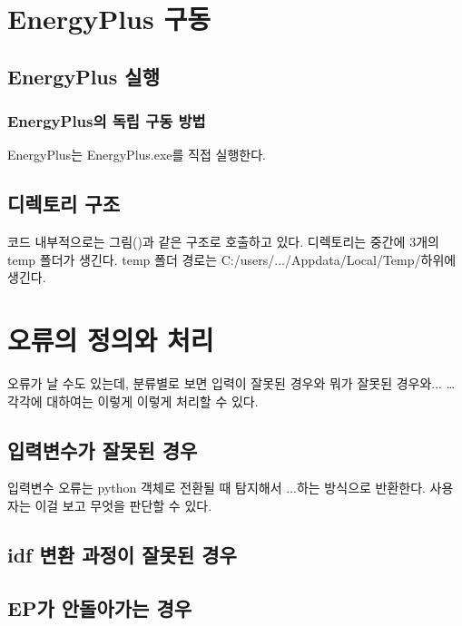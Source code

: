 
\section{EnergyPlus 구동}
\subsection{EnergyPlus 실행}
\subsubsection{EnergyPlus의 독립 구동 방법}
EnergyPlus는 EnergyPlus.exe를 직접 실행한다.

\subsection{디렉토리 구조}
코드 내부적으로는 그림()과 같은 구조로 호출하고 있다.
디렉토리는 중간에 3개의 temp 폴더가 생긴다.
temp 폴더 경로는 C:/users/.../Appdata/Local/Temp/하위에 생긴다.


\section{오류의 정의와 처리}
오류가 날 수도 있는데, 분류별로 보면 입력이 잘못된 경우와 뭐가 잘못된 경우와... \dots
각각에 대하여는 이렇게 이렇게 처리할 수 있다.

\subsection{입력변수가 잘못된 경우}
입력변수 오류는 python 객체로 전환될 때 탐지해서 ...하는 방식으로 반환한다. 사용자는 이걸 보고 무엇을 판단할 수 있다.

\subsection{idf 변환 과정이 잘못된 경우}

\subsection{EP가 안돌아가는 경우}

